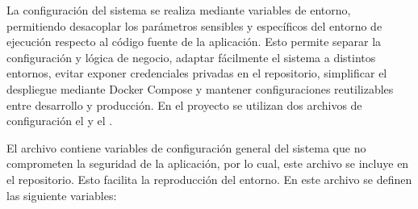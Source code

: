 
La configuración del sistema se realiza mediante variables de entorno, permitiendo desacoplar los parámetros sensibles y específicos del entorno de ejecución respecto al código fuente de la aplicación. Esto permite separar la configuración y lógica de negocio, adaptar fácilmente el sistema a distintos entornos, evitar exponer credenciales privadas en el repositorio, simplificar el despliegue mediante Docker Compose y mantener configuraciones reutilizables entre desarrollo y producción. En el proyecto se utilizan dos archivos de configuración el  y el .

El archivo  contiene variables de configuración general del sistema que no comprometen la seguridad de la aplicación, por lo cual, este archivo se incluye en el repositorio. Esto facilita la reproducción del entorno. En este archivo se definen las siguiente variables:

